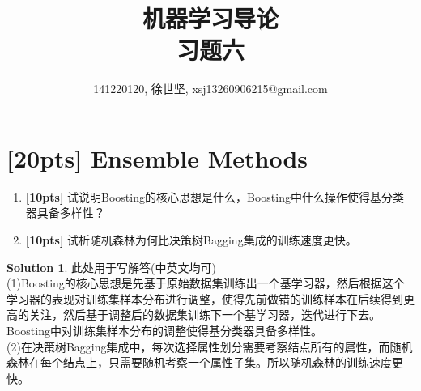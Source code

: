 \documentclass[a4paper,UTF8]{article}
\numberwithin{equation}{section}
\theoremstyle{definition}
\newtheorem*{solution}{Solution}
\begin{document}
\title{机器学习导论\\
习题六}
\author{141220120, 徐世坚, xsj13260906215@gmail.com}
\maketitle

\section{[20pts] Ensemble Methods}
\begin{enumerate}[ {(}1{)}]
\item \textbf{[10pts]} 试说明Boosting的核心思想是什么，Boosting中什么操作使得基分类器具备多样性？

\item \textbf{[10pts]} 试析随机森林为何比决策树Bagging集成的训练速度更快。
\end{enumerate}
\begin{solution}
此处用于写解答(中英文均可)\\
(1)Boosting的核心思想是先基于原始数据集训练出一个基学习器，然后根据这个学习器的表现对训练集样本分布进行调整，使得先前做错的训练样本在后续得到更高的关注，然后基于调整后的数据集训练下一个基学习器，迭代进行下去。\\
Boosting中对训练集样本分布的调整使得基分类器具备多样性。\\
(2)在决策树Bagging集成中，每次选择属性划分需要考察结点所有的属性，而随机森林在每个结点上，只需要随机考察一个属性子集。所以随机森林的训练速度更快。\\
\end{solution}
\end{document}
